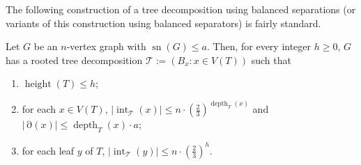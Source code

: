 \documentclass{patmorin}
\newcommand{\pat}[1]{\textcolor{Blue}{[Pat: #1]}}
\DeclareMathOperator{\sep}{sn}
\DeclareMathOperator{\depth}{depth}
\DeclareMathOperator{\height}{height}
\DeclareMathOperator{\interior}{int}
\DeclareMathOperator{\boundary}{\partial}
\newcommand{\hussein}[1]{\textcolor{purple}{HH: #1}}
\begin{document}
The following construction of a tree decomposition using balanced separations (or variants of this construction using balanced separators) is fairly standard.

\begin{lem}\label{separation_tree}
  Let $G$ be an $n$-vertex graph with $\sep(G)\le a$.  Then, for every integer $h\ge 0$, $G$ has a rooted tree decomposition $\mathcal{T}:=(B_x:x\in V(T))$ such that
  \begin{enumerate}[nosep,nolistsep,label=(\roman*)]
    \item\label{height_bound} $\height(T)\le h$;
    \item\label{size_bounds} for each $x\in V(T)$,  $|\interior_\mathcal{T}(x)|\le n\cdot(\tfrac{2}{3})^{\depth_T(x)}$ and $|\boundary(x)|\le \depth_T(x)\cdot a$;
    \item\label{leaf_size_bounds} for each leaf $y$ of $T$, $|\interior_{\mathcal{T}}(y)|\le n\cdot(\tfrac{2}{3})^h$.
  \end{enumerate}
\end{lem}


\end{document}
